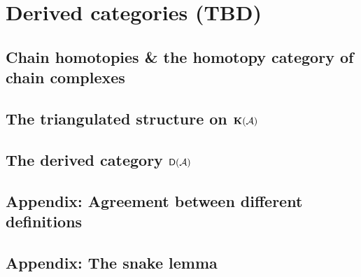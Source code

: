 
\section{Derived categories (TBD)}
\subsection{Chain homotopies \& the homotopy category of chain complexes}
\subsection{The triangulated structure on \(\mathbf{K}(\mathcal{A})\)}
\subsection{The derived category \(\mathsf{D}(\mathcal{A})\)}
\subsection{Appendix: Agreement between different definitions}
\subsection{Appendix: The snake lemma}
